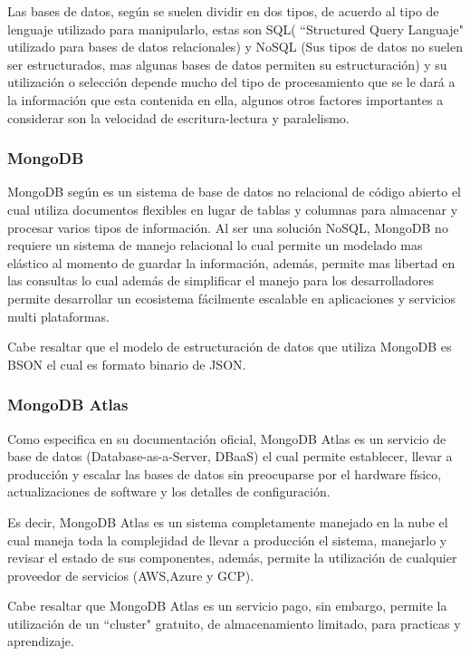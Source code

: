 Las bases de datos, según \cite{bbddTipos} se suelen dividir en dos tipos, de
acuerdo al tipo de lenguaje
utilizado para manipularlo, estas son SQL( ``Structured Query Languaje" utilizado
para bases de datos relacionales) y NoSQL (Sus tipos de datos no suelen ser
estructurados, mas algunas bases de datos permiten su estructuración) y su
utilización o selección depende mucho del tipo de procesamiento que se le
dará a la información que esta contenida en ella, algunos otros factores importantes
a considerar son la velocidad de escritura-lectura y paralelismo.

\subsubsection{MongoDB}
MongoDB según \cite{MongoDB} es un sistema de base de datos no relacional de código
abierto el cual utiliza documentos flexibles en lugar de tablas y columnas para
almacenar y procesar varios tipos de información. Al ser una solución NoSQL,
MongoDB no requiere un sistema de manejo relacional lo cual permite un modelado
mas elástico al momento de guardar la información, además, permite mas libertad
en las consultas lo cual además de simplificar el manejo para los desarrolladores
permite desarrollar un ecosistema fácilmente escalable en aplicaciones y servicios
multi plataformas.

Cabe resaltar que el modelo de estructuración de datos que utiliza MongoDB es
BSON el cual es formato binario de JSON.

\subsubsection{MongoDB Atlas}
Como \cite{MongoDBAtlas} especifica en su documentación oficial, MongoDB Atlas
es un servicio de base de datos (Database-as-a-Server, DBaaS) el cual permite
establecer, llevar a producción y escalar las bases de datos sin preocuparse por
el hardware físico, actualizaciones de software y los detalles de configuración.

Es decir, MongoDB Atlas es un sistema completamente manejado en la nube el cual
maneja toda la complejidad de llevar a producción el sistema, manejarlo y revisar
el estado de sus componentes, además, permite la utilización de cualquier proveedor
de servicios (AWS,Azure y GCP).

Cabe resaltar que MongoDB Atlas es un servicio pago, sin embargo, permite la
utilización de un ``cluster" gratuito, de almacenamiento limitado, para
practicas y aprendizaje.


